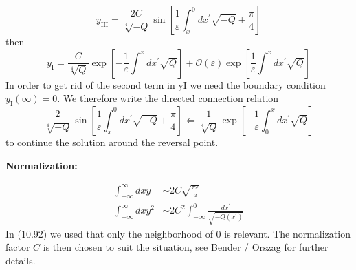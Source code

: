 \begin{equation}
    y_{\mathrm{III}}=\frac{2 C}{\sqrt[4]{-Q}} \sin \left[\frac{1}{\varepsilon} \int_{x}^{0} d x^{\prime} \sqrt{-Q}+\frac{\pi}{4}\right]
    \end{equation}
then
\begin{equation}
    y_{\mathrm{I}}=\frac{C}{\sqrt[4]{Q}} \exp \left[-\frac{1}{\varepsilon} \int^{x} d x^{\prime} \sqrt{Q}\right]+\mathcal{O}(\varepsilon) \exp \left[\frac{1}{\varepsilon} \int^{x} d x^{\prime} \sqrt{Q}\right]
    \end{equation}
In order to get rid of the second term in yI we need the boundary condition $y_{\text{I}} (\infty) = 0$. We therefore write the directed connection relation
\begin{equation}
    \frac{2}{\sqrt[4]{-Q}} \sin \left[\frac{1}{\varepsilon} \int_{x}^{0} d x^{\prime} \sqrt{-Q}+\frac{\pi}{4}\right] \Longleftarrow \frac{1}{\sqrt[4]{Q}} \exp \left[-\frac{1}{\varepsilon} \int_{0}^{x} d x^{\prime} \sqrt{Q}\right]
    \end{equation}
to continue the solution around the reversal point.\par
\textbf{Normalization:}\par
\begin{align} \int_{-\infty}^{\infty} d x y & \sim 2 C \sqrt{\frac{\pi \varepsilon}{a}} \\ \int_{-\infty}^{\infty} d x y^{2} & \sim 2 C^{2} \int_{-\infty}^{0} \frac{d x^{\prime}}{\sqrt{-Q\left(x^{\prime}\right)}} \end{align}
In (10.92) we used that only the neighborhood of 0 is relevant. The normalization factor $C$ is then chosen to suit the situation, see Bender / Orszag for further details.


